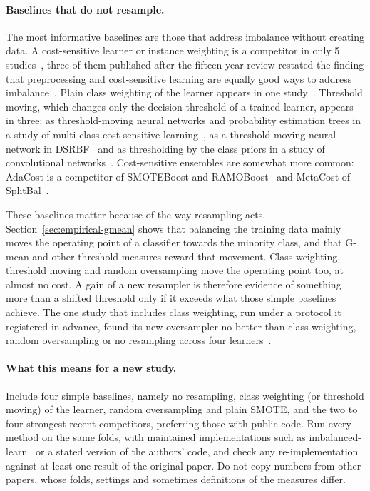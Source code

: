 \paragraph{Baselines that do not resample.} The most informative baselines are those that address imbalance without creating data. A cost-sensitive learner or instance weighting is a competitor in only 5 studies~\parencite{fernandez2013analysing,yang2018amdo,yao2021emdo,xie2022gdo,yadav2025ciso}, three of them published after the fifteen-year review restated the finding that preprocessing and cost-sensitive learning are equally good ways to address imbalance~\parencite{lopez2012analysis,fernandez2018smote}. Plain class weighting of the learner appears in one study~\parencite{yadav2025ciso}. Threshold moving, which changes only the decision threshold of a trained learner, appears in three: as threshold-moving neural networks and probability estimation trees in a study of multi-class cost-sensitive learning~\parencite{zhou2010globalcs}, as a threshold-moving neural network in DSRBF~\parencite{fernandeznavarro2011dsrbf} and as thresholding by the class priors in a study of convolutional networks~\parencite{buda2018systematic}. Cost-sensitive ensembles are somewhat more common: AdaCost is a competitor of SMOTEBoost and RAMOBoost~\parencite{chawla2003smoteboost,chen2010ramoboost} and MetaCost of SplitBal~\parencite{sun2015splitbal}.

These baselines matter because of the way resampling acts. Section~\ref{sec:empirical-gmean} shows that balancing the training data mainly moves the operating point of a classifier towards the minority class, and that G-mean and other threshold measures reward that movement. Class weighting, threshold moving and random oversampling move the operating point too, at almost no cost. A gain of a new resampler is therefore evidence of something more than a shifted threshold only if it exceeds what those simple baselines achieve. The one study that includes class weighting, run under a protocol it registered in advance, found its new oversampler no better than class weighting, random oversampling or no resampling across four learners~\parencite{yadav2025ciso}.

\paragraph{What this means for a new study.} Include four simple baselines, namely no resampling, class weighting (or threshold moving) of the learner, random oversampling and plain SMOTE, and the two to four strongest recent competitors, preferring those with public code. Run every method on the same folds, with maintained implementations such as imbalanced-learn~\parencite{lemaitre2017imbalanced} or a stated version of the authors' code, and check any re-implementation against at least one result of the original paper. Do not copy numbers from other papers, whose folds, settings and sometimes definitions of the measures differ.

